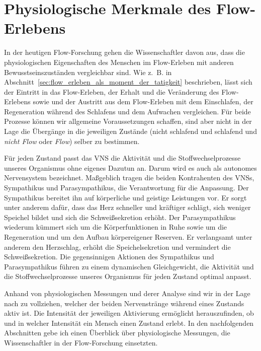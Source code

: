 
\section{Physiologische Merkmale des Flow-Erlebens} %
\label{sec:physiologische_merkmale_des_flow_erlebens}

In der heutigen Flow-Forschung gehen die Wissenschaftler davon aus, dass die physiologischen Eigenschaften des Menschen im Flow-Erleben mit anderen Bewusstseinszuständen vergleichbar sind. Wie z.~B. in Abschnitt~\ref{sec:flow_erleben_als_moment_der_tatigkeit} beschrieben, lässt sich der Eintritt in das Flow-Erleben, der Erhalt und die Veränderung des Flow-Erlebens sowie und der Austritt aus dem Flow-Erleben mit dem Einschlafen, der Regeneration während des Schlafens und dem Aufwachen vergleichen. Für beide Prozesse können wir allgemeine Voraussetzungen schaffen, sind aber nicht in der Lage die Übergänge in die jeweiligen Zustände (nicht schlafend und schlafend und \emph{nicht Flow} oder \emph{Flow}) selber zu bestimmen.

Für jeden Zustand passt das \ac{VNS} die Aktivität und die Stoffwechselprozesse unseres Organismus ohne eigenes Dazutun an. Darum wird es auch als autonomes Nervensystem bezeichnet. Maßgeblich tragen die beiden Kontrahenten des \acs{VNS}s, Sympathikus und Parasympathikus, die Verantwortung für die Anpassung. Der Sympathikus bereitet ihn auf körperliche und geistige Leistungen vor. Er sorgt unter anderem dafür, dass das Herz schneller und kräftiger schlägt, sich weniger Speichel bildet und sich die Schweißsekretion erhöht. Der Parasympathikus wiederum kümmert sich um die Körperfunktionen in Ruhe sowie um die Regeneration und um den Aufbau körpereigener Reserven. Er verlangsamt unter anderem den Herzschlag, erhöht die Speichelsekretion und vermindert die Schweißsekretion. Die gegensinnigen Aktionen des Sympathikus und Parasympathikus führen zu einem dynamischen Gleichgewicht, die Aktivität und die Stoffwechselprozesse unseres Organismus für jeden Zustand optimal anpasst. 

Anhand von physiologischen Messungen und derer Analyse sind wir in der Lage nach zu vollziehen, welcher der beiden Nervenstränge während eines Zustands aktiv ist. Die Intensität der jeweiligen Aktivierung ermöglicht herauszufinden, ob und in welcher Intensität ein Mensch einen Zustand erlebt. In den nachfolgenden Abschnitten gebe ich einen Überblick über physiologische Messungen, die Wissenschaftler in der Flow-Forschung einsetzten.

